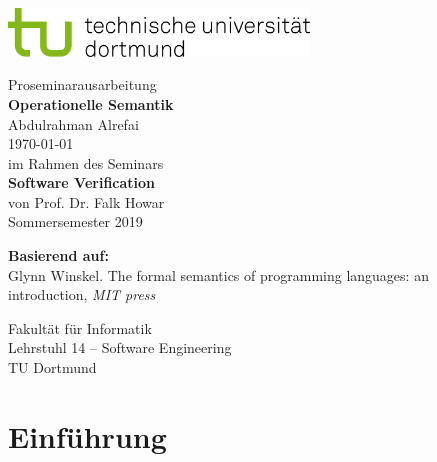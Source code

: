 \documentclass[a4paper,12pt,twoside,headsepline]{scrartcl}
\begin{document}

\begin{titlepage}
\sffamily
\vspace*{-3cm}
\includegraphics[width=8cm]{tud_logo_rgb}

\vspace*{4cm}
\begin{center}
\large
{\Large Proseminarausarbeitung} \\[1ex]
{\LARGE\textbf{Operationelle Semantik}} \\[3ex]
Abdulrahman Alrefai \\[1ex]
\today \\[7ex]
im Rahmen des Seminars \\[1ex]
{\Large\textbf{Software Verification}} \\[1ex]
von Prof. Dr. Falk Howar \\[1ex]
Sommersemester 2019
\end{center}


\noindent
\textbf{Basierend auf:}\\
Glynn Winskel. The formal semantics of programming languages: an introduction, \textit{MIT press}


\vspace*{\fill}
\noindent
Fakultät für Informatik\\
Lehrstuhl 14 -- Software Engineering\\
TU Dortmund
\end{titlepage}


\tableofcontents
\clearpage




\section{Einführung}
\end{document}
